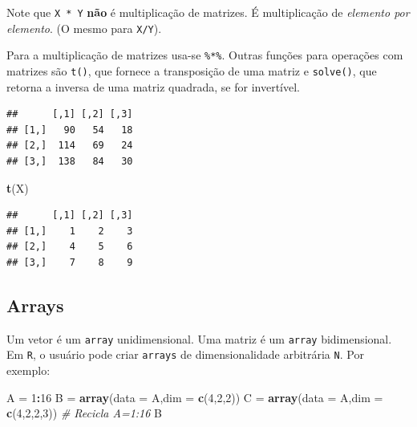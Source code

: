 \documentclass[
]{book}
\newenvironment{Shaded}{\begin{snugshade}}{\end{snugshade}}
\newcommand{\CommentTok}[1]{\textcolor[rgb]{0.56,0.35,0.01}{\textit{#1}}}
\newcommand{\DataTypeTok}[1]{\textcolor[rgb]{0.13,0.29,0.53}{#1}}
\newcommand{\DecValTok}[1]{\textcolor[rgb]{0.00,0.00,0.81}{#1}}
\newcommand{\KeywordTok}[1]{\textcolor[rgb]{0.13,0.29,0.53}{\textbf{#1}}}
\newcommand{\NormalTok}[1]{#1}
\newcommand{\OperatorTok}[1]{\textcolor[rgb]{0.81,0.36,0.00}{\textbf{#1}}}
\newcommand{\StringTok}[1]{\textcolor[rgb]{0.31,0.60,0.02}{#1}}
\theoremstyle{definition}
\theoremstyle{definition}
\theoremstyle{definition}
\theoremstyle{remark}
\begin{document}
Note que \texttt{X\ *\ Y} \textbf{não} é multiplicação de matrizes. É multiplicação de \emph{elemento por elemento}. (O mesmo para \texttt{X/Y}).

Para a multiplicação de matrizes usa-se \texttt{\%*\%}. Outras funções para operações com matrizes são \texttt{t()}, que fornece a transposição de uma matriz e \texttt{solve()}, que retorna a inversa de uma matriz quadrada, se for invertível.

\begin{Shaded}
\end{Shaded}

\begin{verbatim}
##      [,1] [,2] [,3]
## [1,]   90   54   18
## [2,]  114   69   24
## [3,]  138   84   30
\end{verbatim}

\begin{Shaded}
\begin{Highlighting}[]
\KeywordTok{t}\NormalTok{(X)}
\end{Highlighting}
\end{Shaded}

\begin{verbatim}
##      [,1] [,2] [,3]
## [1,]    1    2    3
## [2,]    4    5    6
## [3,]    7    8    9
\end{verbatim}

\hypertarget{arrays}{%
\subsection{Arrays}\label{arrays}}

Um vetor é um \texttt{array} unidimensional. Uma matriz é um \texttt{array} bidimensional. Em \texttt{R}, o usuário pode criar \texttt{arrays} de dimensionalidade arbitrária \texttt{N}. Por exemplo:

\begin{Shaded}
\begin{Highlighting}[]
\NormalTok{A =}\StringTok{ }\DecValTok{1}\OperatorTok{:}\DecValTok{16}
\NormalTok{B =}\StringTok{ }\KeywordTok{array}\NormalTok{(}\DataTypeTok{data =}\NormalTok{ A,}\DataTypeTok{dim =} \KeywordTok{c}\NormalTok{(}\DecValTok{4}\NormalTok{,}\DecValTok{2}\NormalTok{,}\DecValTok{2}\NormalTok{))}
\NormalTok{C =}\StringTok{ }\KeywordTok{array}\NormalTok{(}\DataTypeTok{data =}\NormalTok{ A,}\DataTypeTok{dim =} \KeywordTok{c}\NormalTok{(}\DecValTok{4}\NormalTok{,}\DecValTok{2}\NormalTok{,}\DecValTok{2}\NormalTok{,}\DecValTok{3}\NormalTok{))  }\CommentTok{# Recicla A=1:16}
\NormalTok{B}
\end{Highlighting}
\end{Shaded}
\end{document}
